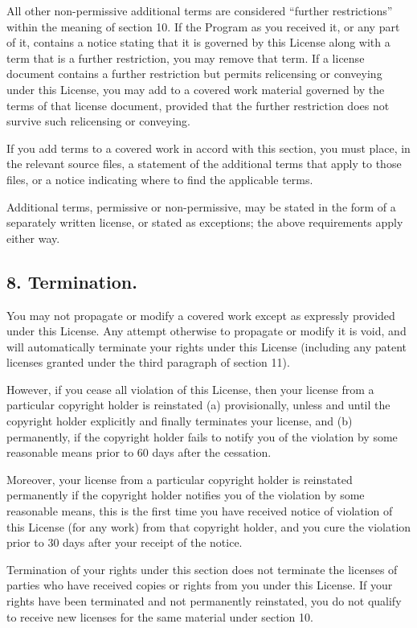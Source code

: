 All other non-permissive additional terms are considered “further restrictions” within the meaning of section 10. If the Program as you received it, or any part of it, contains a notice stating that it is governed by this License along with a term that is a further restriction, you may remove that term. If a license document contains a further restriction but permits relicensing or conveying under this License, you may add to a covered work material governed by the terms of that license document, provided that the further restriction does not survive such relicensing or conveying.\par
If you add terms to a covered work in accord with this section, you must place, in the relevant source files, a statement of the additional terms that apply to those files, or a notice indicating where to find the applicable terms.\par
Additional terms, permissive or non-permissive, may be stated in the form of a separately written license, or stated as exceptions; the above requirements apply either way.
\subsection{8. Termination.}
You may not propagate or modify a covered work except as expressly provided under this License. Any attempt otherwise to propagate or modify it is void, and will automatically terminate your rights under this License (including any patent licenses granted under the third paragraph of section 11).\par
However, if you cease all violation of this License, then your license from a particular copyright holder is reinstated (a) provisionally, unless and until the copyright holder explicitly and finally terminates your license, and (b) permanently, if the copyright holder fails to notify you of the violation by some reasonable means prior to 60 days after the cessation.\par
Moreover, your license from a particular copyright holder is reinstated permanently if the copyright holder notifies you of the violation by some reasonable means, this is the first time you have received notice of violation of this License (for any work) from that copyright holder, and you cure the violation prior to 30 days after your receipt of the notice.\par
Termination of your rights under this section does not terminate the licenses of parties who have received copies or rights from you under this License. If your rights have been terminated and not permanently reinstated, you do not qualify to receive new licenses for the same material under section 10.
